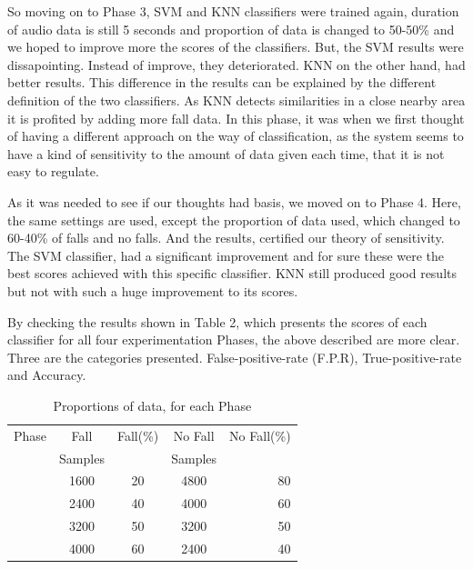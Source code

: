 \documentclass{article}
\begin{document}
So moving on to Phase 3, SVM and KNN classifiers were trained again, duration of audio data is still 5 seconds and proportion of data is changed to 50-50\% and we hoped to improve more the scores of the classifiers. But, the SVM results were dissapointing. Instead of improve, they deteriorated. KNN on the other hand, had better results. This difference in the results can be explained by the different definition of the two classifiers. As KNN detects similarities in a close nearby area it is profited by adding more fall data. In this phase, it was when we first thought of having a different approach on the way of classification, as the system seems to have a kind of sensitivity to the amount of data given each time, that it is not easy to regulate. 

As it was needed to see if our thoughts had basis, we moved on to Phase 4. Here, the same settings are used, except the proportion of data used, which changed to 60-40\% of falls and no falls. And the results, certified our theory of sensitivity. The SVM classifier, had a significant improvement and for sure these were the best scores achieved with this specific classifier. KNN still produced good results but not with such a huge improvement to its scores. 

By checking the results shown in Table 2, which presents the scores of each classifier for all four experimentation Phases, the above described are more clear. Three are the categories presented. False-positive-rate (F.P.R), True-positive-rate and Accuracy.  

\begin{table}[ht]
\caption{Proportions of data, for each Phase}
\label{Data}
\begin{center}
\begin{small}
\begin{sc}
\begin{tabular}{lcccr}
\hline
\abovespace
Phase & Fall & Fall(\%) & No Fall & No Fall(\%) \\
      & Samples &        & Samples &            \\ 
\hline
\abovespace
1    & 1600 & 20 & 4800 & 80 \\
\hline
\abovespace
2    & 2400 & 40 & 4000 & 60 \\
\hline
\abovespace
3    & 3200 & 50 & 3200 & 50 \\
\hline
\abovespace
4    & 4000 & 60 & 2400 & 40 \\
\hline
\end{tabular}
\end{sc}
\end{small}
\end{center}
\vskip 0.1in
\end{table}
\end{document}
